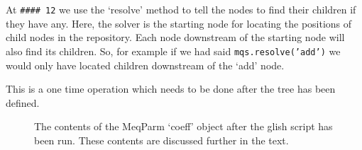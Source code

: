 \documentclass[10pt]{article}
\begin{document}
At {\tt \#\#\#\# 12}  we use the `resolve' method to tell the nodes
to find their children if they have any.
Here, the solver is the starting node for
locating the positions of child nodes in the repository. Each
node downstream of the starting node will also find its children.
So, for example if we had said {\tt mqs.resolve('add')} we would only
have located children downstream of the `add' node.

This is a one time operation which needs to be done after the tree has been
defined.

\begin{figure}
{\par\centering
{}
\par}
\caption {The contents of the MeqParm `coeff' object after the glish
script has been run. These contents are discussed further in the text.}
\label{fig:coeff}
\end{figure}
\end{document}
